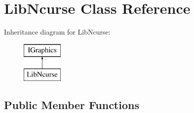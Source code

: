 \hypertarget{class_lib_ncurse}{}\section{Lib\+Ncurse Class Reference}
\label{class_lib_ncurse}
Inheritance diagram for Lib\+Ncurse\+:\begin{figure}[H]
\begin{center}
\leavevmode
\includegraphics[height=2.000000cm]{class_lib_ncurse}
\end{center}
\end{figure}
\subsection*{Public Member Functions}
